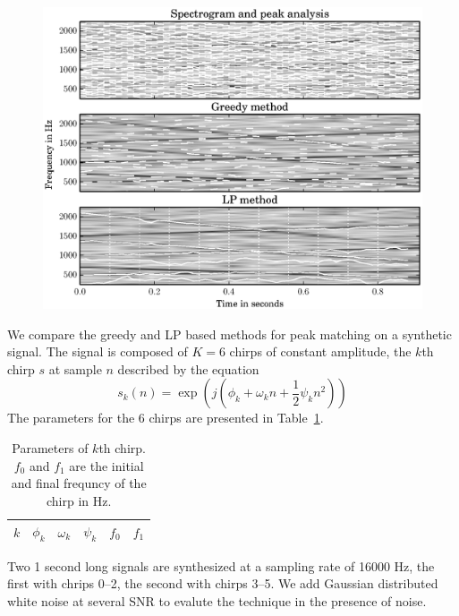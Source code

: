 \begin{figure}[!t]
    \centering
    \includegraphics[width=\figwidthscale\textwidth]{plots/mq_lp_compare_chirp_10.eps}
\end{figure}

We compare the greedy and LP based methods for peak matching on a synthetic
signal. The signal is composed of $K=6$ chirps of constant amplitude, the $k$th
chirp $s$ at sample $n$ described by the equation
\[
    s_{k}(n) = \exp(j(\phi_{k} + \omega_{k}n +
    \frac{1}{2} \psi_{k} n^{2}))
\]
The parameters for the 6 chirps are presented in
Table~\ref{tab:ptrackexamplechirpparams}.
\begin{table}
    \caption{Parameters of $k$th chirp. $f_{0}$ and $f_{1}$ are the initial and
    final frequncy of the chirp in Hz. \label{tab:ptrackexamplechirpparams}}
    \begin{center}
        \begin{tabular}{l c c c c c}
            $k$ & $\phi_{k}$ & $\omega_{k}$ & $\psi_{k}$ & $f_{0}$ & $f_{1}$ \\
            \hline
            
        \end{tabular}
    \end{center}
\end{table}

Two 1 second long signals are synthesized at a sampling rate of 16000 Hz, the
first with chrips 0--2, the second with chirps 3--5. We add
Gaussian distributed white noise at several SNR to evalute the technique in the
presence of noise.

